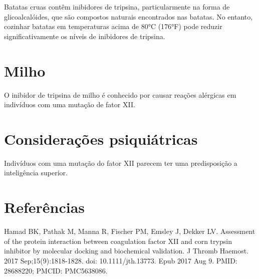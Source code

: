\documentclass{article}
\begin{document}
Batatas cruas contêm inibidores de tripsina, particularmente na forma de glicoalcalóides, que são compostos naturais encontrados nas batatas. No entanto, cozinhar batatas em temperaturas acima de 80°C (176°F) pode reduzir significativamente os níveis de inibidores de tripsina.

\section{Milho}

O inibidor de tripsina de milho é conhecido por causar reações
alérgicas em indivíduos com uma mutação de fator XII.

\section{Considerações psiquiátricas}

Indivíduos com uma mutação do fator XII parecem ter uma predisposição
a inteligência superior.

\section{Referências}

Hamad BK, Pathak M, Manna R, Fischer PM, Emsley J, Dekker LV. Assessment of the protein interaction between coagulation factor XII and corn trypsin inhibitor by molecular docking and biochemical validation. J Thromb Haemost. 2017 Sep;15(9):1818-1828. doi: 10.1111/jth.13773. Epub 2017 Aug 9. PMID: 28688220; PMCID: PMC5638086.
\end{document}
